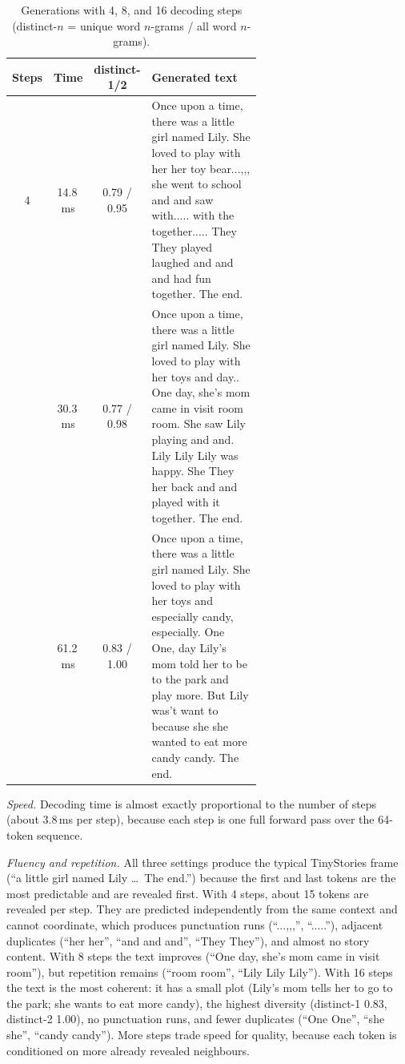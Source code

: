 \documentclass[11pt,a4paper]{article}
\begin{document}
\begin{table}[H]
    \centering
    \caption{Generations with 4, 8, and 16 decoding steps (distinct-$n$ =
    unique word $n$-grams / all word $n$-grams).}
    \label{tab:p2-gen}
    \small
    \begin{tabular}{c c c p{0.62\linewidth}}
        \toprule
        Steps & Time & distinct-1/2 & Generated text\\
        \midrule
        4 & 14.8\,ms & 0.79 / 0.95 & Once upon a time, there was a little girl named Lily. She loved to play with her her toy bear...,,, she went to school and and saw with..... with the together..... They They played laughed and and and had fun together. The end.\\
        \addlinespace
        8 & 30.3\,ms & 0.77 / 0.98 & Once upon a time, there was a little girl named Lily. She loved to play with her toys and day.. One day, she's mom came in visit room room. She saw Lily playing and and. Lily Lily Lily was happy. She They her back and and played with it together. The end.\\
        \addlinespace
        16 & 61.2\,ms & 0.83 / 1.00 & Once upon a time, there was a little girl named Lily. She loved to play with her toys and especially candy, especially. One One, day Lily's mom told her to be to the park and play more. But Lily was't want to because she she wanted to eat more candy candy. The end.\\
        \bottomrule
    \end{tabular}
\end{table}

\emph{Speed.} Decoding time is almost exactly proportional to the
number of steps (about 3.8\,ms per step), because each step is one full
forward pass over the 64-token sequence.

\emph{Fluency and repetition.} All three settings produce the typical
TinyStories frame (``a little girl named Lily \ldots\ The end.'')
because the first and last tokens are the most predictable and are
revealed first. With 4 steps, about 15 tokens are revealed per step.
They are predicted independently from the same context and cannot
coordinate, which produces punctuation runs (``...,,,'', ``.....''),
adjacent duplicates (``her her'', ``and and and'', ``They They''), and
almost no story content. With 8 steps the text improves (``One day,
she's mom came in visit room''), but repetition remains (``room room'',
``Lily Lily Lily''). With 16 steps the text is the most coherent: it has
a small plot (Lily's mom tells her to go to the park; she wants to eat
more candy), the highest diversity (distinct-1 0.83, distinct-2 1.00),
no punctuation runs, and fewer duplicates (``One One'', ``she she'',
``candy candy''). More steps trade speed for quality, because each token
is conditioned on more already revealed neighbours.
\end{document}
